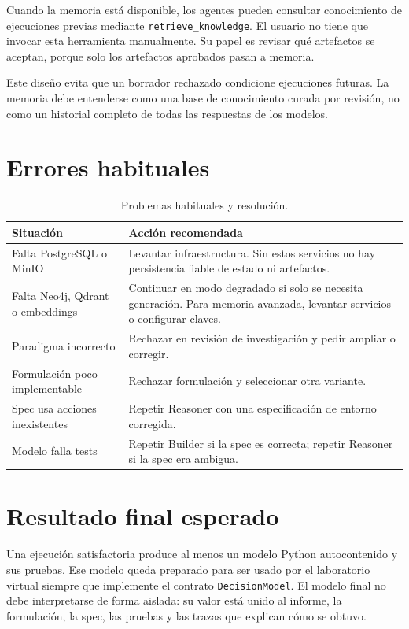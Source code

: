 Cuando la memoria está disponible, los agentes pueden consultar conocimiento de
ejecuciones previas mediante \texttt{retrieve\_knowledge}. El usuario no tiene
que invocar esta herramienta manualmente. Su papel es revisar qué artefactos se
aceptan, porque solo los artefactos aprobados pasan a memoria.

Este diseño evita que un borrador rechazado condicione ejecuciones futuras. La
memoria debe entenderse como una base de conocimiento curada por revisión, no
como un historial completo de todas las respuestas de los modelos.

\section{Errores habituales}

\begin{table}[H]
\begin{center}
\small
\begin{tabular}{|>{\raggedright\arraybackslash}p{4cm}|>{\raggedright\arraybackslash}p{8.2cm}|} \hline
\textbf{Situación} & \textbf{Acción recomendada} \\ \hline
Falta PostgreSQL o MinIO & Levantar infraestructura. Sin estos servicios no hay persistencia fiable de estado ni artefactos. \\ \hline
Falta Neo4j, Qdrant o embeddings & Continuar en modo degradado si solo se necesita generación. Para memoria avanzada, levantar servicios o configurar claves. \\ \hline
Paradigma incorrecto & Rechazar en revisión de investigación y pedir ampliar o corregir. \\ \hline
Formulación poco implementable & Rechazar formulación y seleccionar otra variante. \\ \hline
Spec usa acciones inexistentes & Repetir Reasoner con una especificación de entorno corregida. \\ \hline
Modelo falla tests & Repetir Builder si la spec es correcta; repetir Reasoner si la spec era ambigua. \\ \hline
\end{tabular}
\caption{Problemas habituales y resolución.}
\end{center}
\end{table}

\section{Resultado final esperado}

Una ejecución satisfactoria produce al menos un modelo Python autocontenido y
sus pruebas. Ese modelo queda preparado para ser usado por el laboratorio
virtual siempre que implemente el contrato \texttt{DecisionModel}. El modelo
final no debe interpretarse de forma aislada: su valor está unido al informe,
la formulación, la spec, las pruebas y las trazas que explican cómo se obtuvo.
